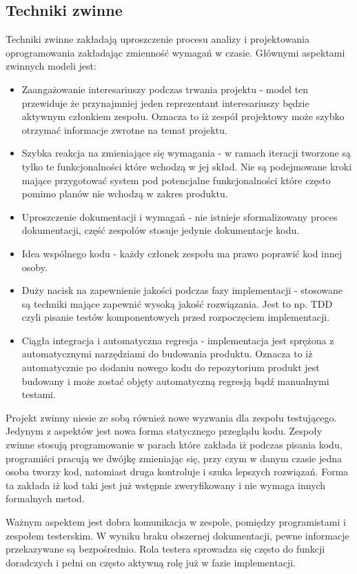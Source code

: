 \subsection{Techniki zwinne}
Techniki zwinne zakładają uproszczenie procesu analizy i projektowania oprogramowania zakładając zmienność wymagań w czasie. Głównymi aspektami zwinnych modeli jest:
\begin{itemize}
  \item Zaangażowanie interesariuszy podczas trwania projektu - model ten przewiduje że przynajmniej jeden reprezentant interesariuszy będzie aktywnym członkiem zespołu. Oznacza to iż zespół projektowy może szybko otrzymać informacje zwrotne na temat projektu.
  \item Szybka reakcja na zmieniające się wymagania - w ramach iteracji tworzone są tylko te funkcjonalności które wchodzą w jej skład. Nie są podejmowane kroki mające przygotować system pod potencjalne funkcjonalności które często pomimo planów nie wchodzą w zakres produktu. 
  \item Uproszczenie dokumentacji i wymagań - nie istnieje sformalizowany proces dokumentacji, część zespołów stosuje jedynie dokumentacje kodu.
  \item Idea wspólnego kodu - każdy członek zespołu ma prawo poprawić kod innej osoby.
  \item Duży nacisk na zapewnienie jakości podczas fazy implementacji - stosowane są techniki mające zapewnić wysoką jakość rozwiązania. Jest to np. TDD czyli pisanie testów komponentowych przed rozpoczęciem implementacji.
  \item Ciągła integracja i automatyczna regresja - implementacja jest sprężona z automatycznymi narzędziami do budowania produktu. Oznacza to iż automatycznie po dodaniu nowego kodu do repozytorium produkt jest budowany i może zostać objęty automatyczną regresją bądź manualnymi testami.
\end{itemize}
Projekt zwinny niesie ze sobą również nowe wyzwania dla zespołu testującego. Jedynym z aspektów jest nowa forma statycznego przeglądu kodu. Zespoły zwinne stosują programowanie w parach które zakłada iż podczas pisania kodu, programiści pracują we dwójkę zmieniając się, przy czym w danym czasie jedna osoba tworzy kod, natomiast druga kontroluje i szuka lepszych rozwiązań. Forma ta zakłada iż kod taki jest już wstępnie zweryfikowany i nie wymaga innych formalnych metod. 

Ważnym aspektem jest dobra komunikacja w zespole, pomiędzy programistami i zespołem testerskim. W wyniku braku obszernej dokumentacji, pewne informacje przekazywane są bezpośrednio. Rola testera sprowadza się często do funkcji doradczych i pełni on często aktywną rolę już w fazie implementacji.

